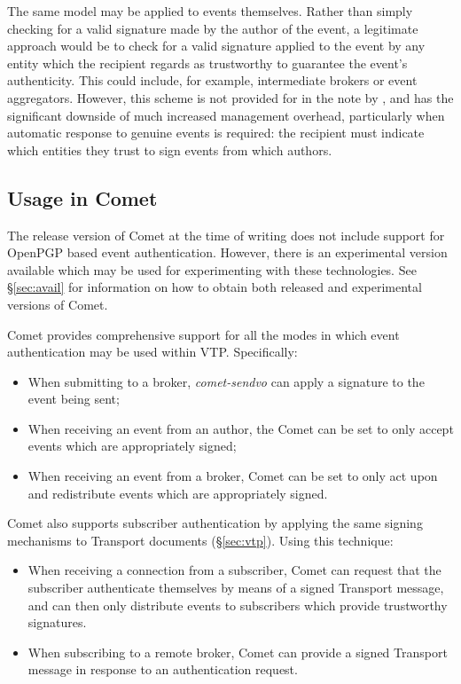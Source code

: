 \documentclass[5p,authoryear]{elsarticle}
\begin{document}
The same model may be applied to events themselves. Rather than simply
checking for a valid signature made by the author of the event, a legitimate
approach would be to check for a valid signature applied to the event by any
entity which the recipient regards as trustworthy to guarantee the event's
authenticity. This could include, for example, intermediate brokers or event
aggregators. However, this scheme is not provided for in the note by
\citeauthor{Denny:2008}, and has the significant downside of much increased
management overhead, particularly when automatic response to genuine events is
required: the recipient must indicate which entities they trust to sign events
from which authors.

\subsection{Usage in Comet}

The release version of Comet at the time of writing does not include support
for OpenPGP based event authentication. However, there is an experimental
version available which may be used for experimenting with these technologies.
See \S\ref{sec:avail} for information on how to obtain both released and
experimental versions of Comet.

Comet provides comprehensive support for all the modes in which event
authentication may be used within VTP. Specifically:

\begin{itemize}

  \item{When submitting to a broker, \textit{comet-sendvo} can apply a
  signature to the event being sent;}

  \item{When receiving an event from an author, the Comet can be set to
  only accept events which are appropriately signed;}

  \item{When receiving an event from a broker, Comet can be set to only act
  upon and redistribute events which are appropriately signed.}

\end{itemize}

Comet also supports subscriber authentication by applying the same signing
mechanisms to Transport documents (\S\ref{sec:vtp}). Using this technique:

\begin{itemize}

  \item{When receiving a connection from a subscriber, Comet can request that
  the subscriber authenticate themselves by means of a signed Transport
  message, and can then only distribute events to subscribers which provide
  trustworthy signatures.}

  \item{When subscribing to a remote broker, Comet can provide a signed
  Transport message in response to an authentication request.}

\end{itemize}
\end{document}
